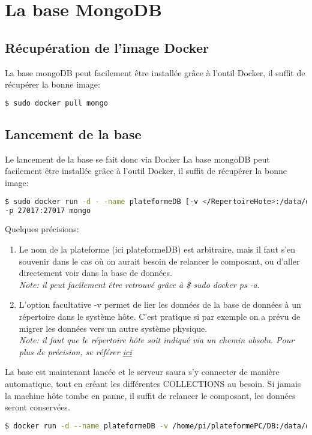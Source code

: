 \documentclass[a4paper]{article}
\begin{document}
\section{La base MongoDB}
\subsection{Récupération de l'image Docker}
La base mongoDB peut facilement être installée grâce à l'outil Docker, il suffit de récupérer la bonne image:
\begin{lstlisting}[language=bash]
  $ sudo docker pull mongo
\end{lstlisting}
\subsection{Lancement de la base}
Le lancement de la base se fait donc via Docker
La base mongoDB peut facilement être installée grâce à l'outil Docker, il suffit de récupérer la bonne image:
\begin{lstlisting}[language=bash]
$ sudo docker run -d - -name plateformeDB [-v </RepertoireHote>:/data/db] 
-p 27017:27017 mongo
\end{lstlisting}
Quelques précisions:
\begin{enumerate}
\item Le nom de la plateforme (ici plateformeDB) est arbitraire, mais il faut s'en souvenir dans le cas où on aurait besoin de relancer le composant, ou d'aller directement voir dans la base de données. \\
\textit{Note: il peut facilement être retrouvé grâce à \$ sudo docker ps -a}.
\item L'option facultative -v permet de lier les données de la base de données à un répertoire dans le système hôte. C'est pratique si par exemple on a prévu de migrer les données vers un autre système physique.\\
\textit{Note: il faut que le répertoire hôte soit indiqué via un chemin absolu. Pour plus de précision, se référer \href{https://docs.docker.com/engine/reference/commandline/run/\#/mount-volume--v---read-only}{ici}}
\end{enumerate}
La base est maintenant lancée et le serveur saura s'y connecter de manière automatique, tout en créant les différentes COLLECTIONS au besoin. Si jamais la machine hôte tombe en panne, il suffit de relancer le composant, les données seront conservées.
\begin{lstlisting}[language=bash]
  $ docker run -d --name plateformeDB -v /home/pi/plateformePC/DB:/data/db -p 27017:27017 descol/rpi-mongo
\end{lstlisting}
\end{document}
